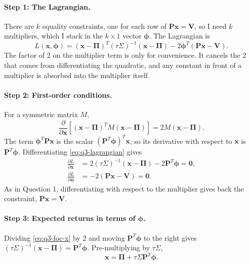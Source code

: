 \documentclass[11pt]{article}
\numberwithin{equation}{section}
\begin{document}
\paragraph{Step 1: The Lagrangian.}
There are $k$ equality constraints, one for each row of $\bm{P}\bm{x} = \bm{V}$, so I need $k$ multipliers, which I stack in the $k \times 1$ vector $\bm{\phi}$. The Lagrangian is
\begin{equation}
  L(\bm{x}, \bm{\phi}) = \left(\bm{x} - \bm{\Pi}\right)^{T}(\tau\Sigma)^{-1}\left(\bm{x} - \bm{\Pi}\right) - 2\bm{\phi}^{T}\left(\bm{P}\bm{x} - \bm{V}\right).
  \label{eq:q3-lagrangian}
\end{equation}
The factor of 2 on the multiplier term is only for convenience. It cancels the 2 that comes from differentiating the quadratic, and any constant in front of a multiplier is absorbed into the multiplier itself.

\paragraph{Step 2: First-order conditions.}
For a symmetric matrix $M$,
\begin{equation*}
  \frac{\partial}{\partial\bm{x}}\left[(\bm{x} - \bm{\Pi})^{T}M(\bm{x} - \bm{\Pi})\right] = 2M(\bm{x} - \bm{\Pi}).
\end{equation*}
The term $\bm{\phi}^{T}\bm{P}\bm{x}$ is the scalar $(\bm{P}^{T}\bm{\phi})^{T}\bm{x}$, so its derivative with respect to $\bm{x}$ is $\bm{P}^{T}\bm{\phi}$. Differentiating \eqref{eq:q3-lagrangian} gives
\begin{align}
  \frac{\partial L}{\partial \bm{x}} &= 2(\tau\Sigma)^{-1}\left(\bm{x} - \bm{\Pi}\right) - 2\bm{P}^{T}\bm{\phi} = \mathbf{0}, \label{eq:q3-foc-x}\\
  \frac{\partial L}{\partial \bm{\phi}} &= -2\left(\bm{P}\bm{x} - \bm{V}\right) = \mathbf{0}. \label{eq:q3-foc-phi}
\end{align}
As in Question 1, differentiating with respect to the multiplier gives back the constraint, $\bm{P}\bm{x} = \bm{V}$.

\paragraph{Step 3: Expected returns in terms of $\bm{\phi}$.}
Dividing \eqref{eq:q3-foc-x} by 2 and moving $\bm{P}^{T}\bm{\phi}$ to the right gives $(\tau\Sigma)^{-1}(\bm{x} - \bm{\Pi}) = \bm{P}^{T}\bm{\phi}$. Pre-multiplying by $\tau\Sigma$,
\begin{equation}
  \bm{x} = \bm{\Pi} + \tau\Sigma\bm{P}^{T}\bm{\phi}.
  \label{eq:q3-x-phi}
\end{equation}
\end{document}
